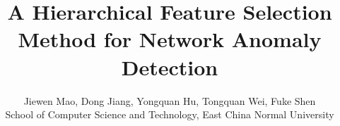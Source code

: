 \documentclass[journal]{IEEEtran}
\begin{document}
%
\title{A Hierarchical Feature Selection Method for Network Anomaly Detection}
%
%
%

\author{Jiewen Mao, Dong Jiang, Yongquan Hu, Tongquan Wei, Fuke Shen\\School of Computer Science and Technology, East China Normal University}%

% 
%
\end{document}
